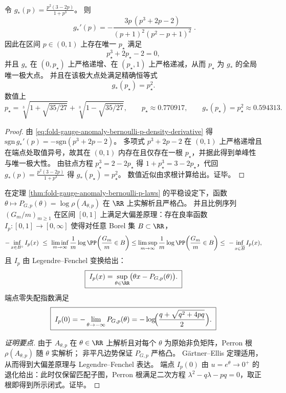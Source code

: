 \begin{corollary}[失配密度的单峰性与唯一极大点]\label{cor:fold-gauge-anomaly-bernoulli-p-density-unimodal}
令 \(g_\ast(p)=\frac{p^2(3-2p)}{1+p^3}\)。
则
\begin{equation}\label{eq:fold-gauge-anomaly-bernoulli-p-density-derivative}
\boxed{\;
g_\ast'(p)=
-\frac{3p\,(p^3+2p-2)}{(p+1)^2(p^2-p+1)^2}\; }.
\end{equation}
因此在区间 \(p\in(0,1)\) 上存在唯一 \(p_\star\) 满足
\begin{equation}\label{eq:fold-gauge-anomaly-bernoulli-p-density-maximizer}
p_\star^3+2p_\star-2=0,
\end{equation}
并且 \(g_\ast\) 在 \((0,p_\star)\) 上严格递增、在 \((p_\star,1)\) 上严格递减，从而 \(p_\star\) 为 \(g_\ast\) 的全局唯一极大点。
并且在该极大点处满足精确恒等式
\[
\boxed{\;g_\ast(p_\star)=p_\star^2.\;}
\]
数值上
\[
p_\star=\sqrt[3]{1+\sqrt{35/27}}+\sqrt[3]{1-\sqrt{35/27}},
\qquad
p_\star\approx 0.770917,
\qquad
g_\ast(p_\star)=p_\star^2\approx 0.594313.
\]
\end{corollary}
\begin{proof}
由 \eqref{eq:fold-gauge-anomaly-bernoulli-p-density-derivative} 得
\(\mathrm{sgn}\,g_\ast'(p)=-\mathrm{sgn}(p^3+2p-2)\)。
多项式 \(p^3+2p-2\) 在 \((0,1)\) 上严格递增且在端点处取值异号，故其在 \((0,1)\) 内存在且仅存在一根 \(p_\star\)，并据此得到单峰性与唯一极大性。
由驻点方程 \(p_\star^3=2-2p_\star\) 得 \(1+p_\star^3=3-2p_\star\)，代回 \(g_\ast(p)=\frac{p^2(3-2p)}{1+p^3}\) 得 \(g_\ast(p_\star)=p_\star^2\)。
数值近似由求根计算给出。证毕。
\end{proof}

\begin{proposition}\label{prop:fold-gauge-anomaly-bernoulli-p-ldp}
在定理 \ref{thm:fold-gauge-anomaly-bernoulli-p-laws} 的平稳设定下，函数 \(\theta\mapsto P_{G,p}(\theta)=\log\rho(A_{\theta,p})\) 在 \(\RR\) 上实解析且严格凸。
并且比例序列 \((G_m/m)_{m\ge 1}\) 在区间 \([0,1]\) 上满足大偏差原理：存在良率函数 \(I_p:[0,1]\to[0,\infty]\) 使得对任意 Borel 集 \(B\subset\RR\)，
\[
-\inf_{x\in B^\circ}I_p(x)\ \le\
\liminf_{m\to\infty}\frac1m\log\PP\!\left(\frac{G_m}{m}\in B\right)
\le
\limsup_{m\to\infty}\frac1m\log\PP\!\left(\frac{G_m}{m}\in B\right)
\le\
-\inf_{x\in \overline B}I_p(x),
\]
且 \(I_p\) 由 Legendre--Fenchel 变换给出：
\[
\boxed{\;
I_p(x)=\sup_{\theta\in\RR}\bigl(\theta x-P_{G,p}(\theta)\bigr). \;}
\]
端点零失配指数满足
\[
\boxed{\;
I_p(0)=-\lim_{\theta\to-\infty}P_{G,p}(\theta)
=-\log\!\Bigl(\frac{q+\sqrt{q^{2}+4pq}}{2}\Bigr). \;}
\]
\end{proposition}
\begin{proof}[证明要点]
由于 \(A_{\theta,p}\) 在 \(\theta\in\RR\) 上解析且对每个 \(\theta\) 为原始非负矩阵，Perron 根 \(\rho(A_{\theta,p})\) 随 \(\theta\) 实解析；
非平凡边势保证 \(P_{G,p}\) 严格凸。
G\"artner--Ellis 定理适用，从而得到大偏差原理与 Legendre--Fenchel 表达。
端点 \(I_p(0)\) 由 \(u=e^\theta\to 0^+\) 的退化给出：此时仅保留匹配子图，Perron 根满足二次方程 \(\lambda^2-q\lambda-pq=0\)，取正根即得到所示闭式。证毕。
\end{proof}

